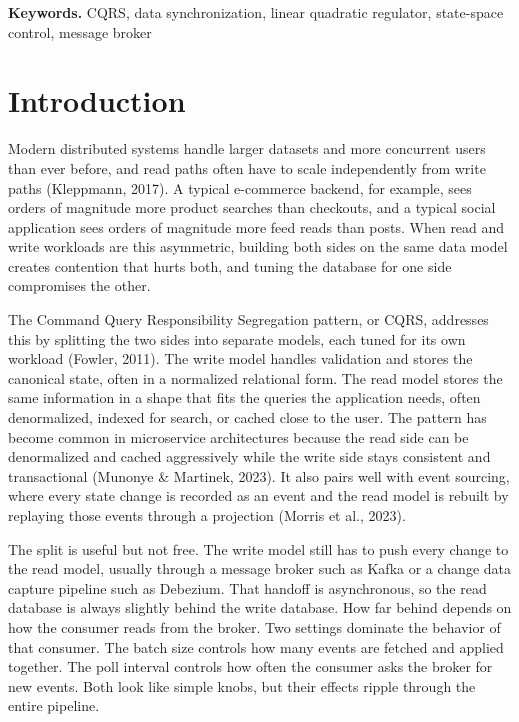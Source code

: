 \documentclass[10pt,a4paper]{article}
\begin{document}
\medskip

\noindent\textbf{Keywords.} CQRS, data synchronization, linear quadratic regulator, state-space control, message broker

\section{Introduction}

Modern distributed systems handle larger datasets and more concurrent users than ever before, and read paths often have to scale independently from write paths (Kleppmann, 2017). A typical e-commerce backend, for example, sees orders of magnitude more product searches than checkouts, and a typical social application sees orders of magnitude more feed reads than posts. When read and write workloads are this asymmetric, building both sides on the same data model creates contention that hurts both, and tuning the database for one side compromises the other.

The Command Query Responsibility Segregation pattern, or CQRS, addresses this by splitting the two sides into separate models, each tuned for its own workload (Fowler, 2011). The write model handles validation and stores the canonical state, often in a normalized relational form. The read model stores the same information in a shape that fits the queries the application needs, often denormalized, indexed for search, or cached close to the user. The pattern has become common in microservice architectures because the read side can be denormalized and cached aggressively while the write side stays consistent and transactional (Munonye \& Martinek, 2023). It also pairs well with event sourcing, where every state change is recorded as an event and the read model is rebuilt by replaying those events through a projection (Morris et al., 2023).

The split is useful but not free. The write model still has to push every change to the read model, usually through a message broker such as Kafka or a change data capture pipeline such as Debezium. That handoff is asynchronous, so the read database is always slightly behind the write database. How far behind depends on how the consumer reads from the broker. Two settings dominate the behavior of that consumer. The batch size controls how many events are fetched and applied together. The poll interval controls how often the consumer asks the broker for new events. Both look like simple knobs, but their effects ripple through the entire pipeline.
\end{document}
